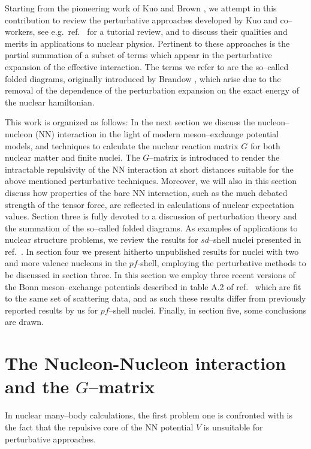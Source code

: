 Starting from the pioneering work of Kuo and Brown \cite{kb66}, we
attempt in this contribution to review the
perturbative approaches developed by Kuo and co--workers, see e.g.\
ref.\ \cite{ko90} for a tutorial review,
and to discuss their qualities and merits in applications to nuclear physics.
Pertinent to these approaches is the partial summation of a subset
of terms which appear in the perturbative expansion of the effective interaction.
The terms we refer to are the so--called folded diagrams, originally
introduced by Brandow \cite{bran67}, which
arise due to the removal of the dependence of the perturbation expansion
on the exact energy of the nuclear hamiltonian.

This work is organized as follows:
In the next section we discuss the nucleon--nucleon (NN) interaction
in the light of modern meson--exchange potential models, and techniques
to calculate the nuclear reaction matrix $G$ for both nuclear matter
and finite nuclei. The $G$--matrix is introduced to render the intractable
repulsivity of the NN interaction at short distances suitable
for the above mentioned perturbative techniques. Moreover, we will also
in this section discuss how properties of the bare NN interaction,
such as the much debated strength of the tensor force, are
reflected in calculations of nuclear expectation values.
Section three is fully devoted to a discussion of perturbation
theory and the summation of the so--called folded diagrams.
As examples of applications to nuclear structure problems, we
review the results for $sd$--shell nuclei presented in ref.\ \cite{hom92}.
In section four we present hitherto
unpublished results for nuclei with two and more valence nucleons
in the $pf$-shell,
employing the perturbative methods to be discussed
in section three.
In this section we employ three recent versions of the Bonn
meson--exchange potentials described in table A.2 of ref.\ \cite{mac89}
which are fit to the same set of scattering data,
and as such these results differ from previously reported results by us
\cite{heho92}
for $pf$--shell nuclei.
Finally, in section five, some conclusions are drawn.



\section{The Nucleon-Nucleon interaction and the $G$--matrix}
In nuclear many--body calculations, the first problem one is confronted
with is the fact
that the repulsive core of the NN potential $V$ is unsuitable for
perturbative approaches.


